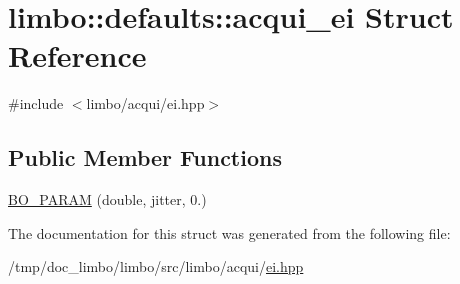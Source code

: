 \hypertarget{structlimbo_1_1defaults_1_1acqui__ei}{}\section{limbo\+:\+:defaults\+:\+:acqui\+\_\+ei Struct Reference}
\label{structlimbo_1_1defaults_1_1acqui__ei}


{\ttfamily \#include $<$limbo/acqui/ei.\+hpp$>$}

\subsection*{Public Member Functions}
\begin{DoxyCompactItemize}
\item 
\hyperlink{group__acqui__defaults_gab43e714d9a9df7e92d6ff205e1d3edc9}{B\+O\+\_\+\+P\+A\+R\+A\+M} (double, jitter, 0.)
\end{DoxyCompactItemize}


The documentation for this struct was generated from the following file\+:\begin{DoxyCompactItemize}
\item 
/tmp/doc\+\_\+limbo/limbo/src/limbo/acqui/\hyperlink{ei_8hpp}{ei.\+hpp}\end{DoxyCompactItemize}
